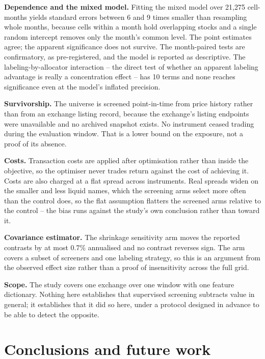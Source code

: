 \documentclass[preprint,11pt,authoryear]{elsarticle}
\begin{document}
\textbf{Dependence and the mixed model.} Fitting the mixed model over 21,275 cell-months yields standard errors between 6 and 9 times smaller than resampling whole months, because cells within a month hold overlapping stocks and a single random intercept removes only the month's common level. The point estimates agree; the apparent significance does not survive. The month-paired tests are confirmatory, as pre-registered, and the model is reported as descriptive. The labeling-by-allocator interaction -- the direct test of whether an apparent labeling advantage is really a concentration effect -- has 10 terms and none reaches significance even at the model's inflated precision.

\textbf{Survivorship.} The universe is screened point-in-time from price history rather than from an exchange listing record, because the exchange's listing endpoints were unavailable and no archived snapshot exists. No instrument ceased trading during the evaluation window. That is a lower bound on the exposure, not a proof of its absence.

\textbf{Costs.} Transaction costs are applied after optimisation rather than inside the objective, so the optimiser never trades return against the cost of achieving it. Costs are also charged at a flat spread across instruments. Real spreads widen on the smaller and less liquid names, which the screening arms select more often than the control does, so the flat assumption flatters the screened arms relative to the control -- the bias runs against the study's own conclusion rather than toward it.

\textbf{Covariance estimator.} The shrinkage sensitivity arm moves the reported contrasts by at most 0.7\% annualised and no contrast reverses sign. The arm covers a subset of screeners and one labeling strategy, so this is an argument from the observed effect size rather than a proof of insensitivity across the full grid.

\textbf{Scope.} The study covers one exchange over one window with one feature dictionary. Nothing here establishes that supervised screening subtracts value in general; it establishes that it did so here, under a protocol designed in advance to be able to detect the opposite.


\section{Conclusions and future work}\label{sec:conclusions}
\end{document}
